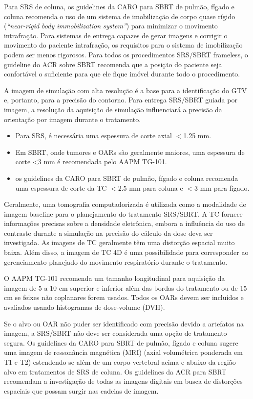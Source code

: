 \documentclass[11pt,a4paper]{article}
\begin{document}
	Para SRS de coluna, os guidelines da CARO para SBRT de pulmão, fígado e coluna recomenda o uso de um sistema de imobilização de corpo quase rígido (\textit{``near-rigid body immobilization system''}) para minimizar o movimento intrafração. Para sistemas de entrega capazes de gerar imagens e corrigir o movimento do paciente intrafração, os requisitos para o sistema de imobilização podem ser menos rigorosos. Para todos os procedimentos SRS/SBRT frameless, o guideline do ACR sobre SBRT recomenda que a posição do paciente seja confortável o suficiente para que ele fique imóvel durante todo o procedimento.

	A imagem de simulação com alta resolução é a base para a identificação do GTV e, portanto, para a precisão do contorno. Para entrega SRS/SBRT guiada por imagem, a resolução da aquisição de simulação influenciará a precisão da orientação por imagem durante o tratamento.

	\begin{itemize}
		\item Para SRS, é necessária uma espessura de corte axial $<$1.25 mm.
		\item Em SBRT, onde tumores e OARs são geralmente maiores, uma espessura de corte <3 mm é recomendada pelo AAPM TG-101.
		\item os guidelines da CARO para SBRT de pulmão, fígado e coluna recomenda uma espessura de corte da TC $<$2.5 mm para coluna e $<$3 mm para fígado. 
	\end{itemize}

	Geralmente, uma tomografia computadorizada é utilizada como a modalidade de imagem baseline para o planejamento do tratamento SRS/SBRT. A TC fornece informações precisas sobre a densidade eletrônica, embora a influência do uso de contraste durante a simulação na precisão do cálculo da dose deva ser investigada. As imagens de TC geralmente têm uma distorção espacial muito baixa. Além disso, a imagem de TC 4D é uma possibilidade para corresponder ao gerenciamento planejado do movimento respiratório durante o tratamento.

	O AAPM TG-101 recomenda um tamanho longitudinal para aquisição da imagem de 5 a 10 cm superior e inferior além das bordas do tratamento ou de 15 cm se feixes não coplanares forem usados. Todos os OARs devem ser incluídos e avaliados usando histogramas de dose-volume (DVH). 

	Se o alvo ou OAR não puder ser identificado com precisão devido a artefatos na imagem, a SRS/SBRT não deve ser considerada uma opção de tratamento segura. Os guidelines da CARO para SBRT de pulmão, fígado e coluna sugere uma imagem de ressonância magnética (MRI) (axial volumétrica ponderada em T1 e T2) estendendo-se além de um corpo vertebral acima e abaixo da região alvo em tratamentos de SRS de coluna. Os guidelines da ACR para SBRT recomendam a investigação de todas as imagens digitais em busca de distorções espaciais que possam surgir nas cadeias de imagem.
\end{document}
